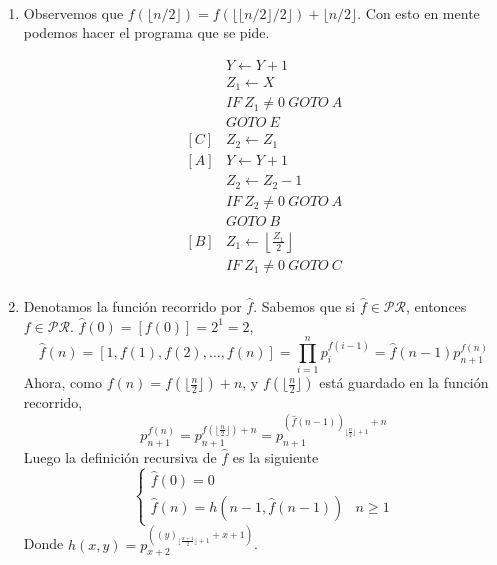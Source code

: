 \documentclass[twoside]{article}
\begin{document}
\begin{solucion}\
\begin{enumerate}
\item Observemos que $f(\lfloor n/2\rfloor)=f(\lfloor\lfloor n/2\rfloor/2\rfloor)+\lfloor n/2\rfloor$. Con esto en mente podemos hacer el programa que se pide.

\begin{align*}
& Y\leftarrow Y+1\\
&Z_1\leftarrow X\\
& IF\ Z_1\neq 0\ GOTO\ A\\
& GOTO\ E\\
[C]&Z_2\leftarrow Z_1\\
[A]& Y\leftarrow Y+1\\
&Z_2\leftarrow Z_2-1\\
&IF\ Z_2\neq 0\ GOTO\ A\\
&GOTO\ B\\
[B]&Z_1\leftarrow \left\lfloor\frac{Z_1}{2}\right\rfloor\\
& IF\ Z_1\neq 0\ GOTO\ C\\
\end{align*}


\item Denotamos la función recorrido por $\hat{f}$. Sabemos que si $\hat{f}\in\mathcal{PR}$, entonces $f\in\mathcal{PR}$. $\hat{f}(0)=[f(0)]=2^1=2$, $$\hat{f}(n)=[1,f(1),f(2),\dots, f(n)]=\prod_{i=1}^{n} p_i^{f(i-1)}=\hat{f}(n-1)p_{n+1}^{f(n)}$$
Ahora, como $f(n)=f(\lfloor\frac{n}{2}\rfloor) + n$, y $f(\lfloor\frac{n}{2}\rfloor)$ está guardado en la función recorrido, 
$$p_{n+1}^{f(n)}=p_{n+1}^{f(\lfloor\frac{n}{2}\rfloor) + n}=p_{n+1}^{(\hat{f}(n-1))_{\lfloor\frac{n}{2}\rfloor+1}+n}$$
Luego la definición recursiva de $\hat{f}$ es la siguiente
\[
\begin{cases}
\hat{f}(0)=0 \\
\hat{f}(n)=h(n-1,\hat{f}(n-1)) & n\geq 1
\end{cases}
\]
Donde $h(x,y)=p_{x+2}^{((y)_{\lfloor\frac{x+1}{2}\rfloor+1}+x+1)}$.
\end{enumerate}
\end{solucion}

\newpage
\end{document}
